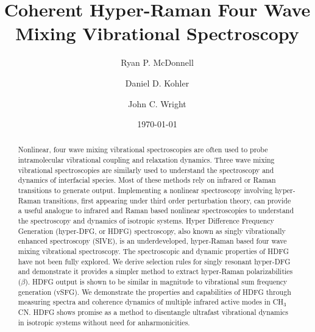 \documentclass[aip, jcp, reprint, twocolumn]{revtex4-2}
\begin{document}
\title{Coherent Hyper-Raman Four Wave Mixing Vibrational Spectroscopy}


\author{Ryan P. McDonnell} 
\author{Daniel D. Kohler}
\author{John C. Wright} 


\date{\today}

\begin{abstract}
Nonlinear, four wave mixing vibrational spectroscopies are often used to probe intramolecular vibrational coupling and relaxation dynamics.
Three wave mixing vibrational spectroscopies are similarly used to understand the spectroscopy and dynamics of interfacial species.
Most of these methods rely on infrared or Raman transitions to generate output. 
Implementing a nonlinear spectroscopy involving hyper-Raman transitions, first appearing under third order perturbation theory, can provide a useful analogue to infrared and Raman based nonlinear spectroscopies to understand the spectroscopy and dynamics of isotropic systems.
Hyper Difference Frequency Generation (hyper-DFG, or HDFG) spectroscopy, also known as singly vibrationally enhanced spectroscopy (SIVE), is an underdeveloped, hyper-Raman based four wave mixing vibrational spectroscopy. 
The spectroscopic and dynamic properties of HDFG have not been fully explored.
We derive selection rules for singly resonant hyper-DFG and demonstrate it provides a simpler method to extract hyper-Raman polarizabilities ($\beta$).
HDFG output is shown to be similar in magnitude to vibrational sum frequency generation (vSFG). 
We demonstrate the properties and capabilities of HDFG through measuring spectra and coherence dynamics of multiple infrared active modes in CH$_3$CN.
HDFG shows promise as a method to disentangle ultrafast vibrational dynamics in isotropic systems without need for anharmonicities.

\end{abstract}

\maketitle
\end{document}
